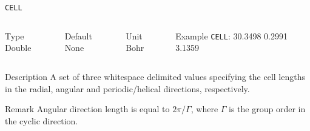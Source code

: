 \begin{frame}[allowframebreaks]{\texttt{{CELL}}} \label{CELL}
\vspace*{-12pt}
\begin{columns}
\begin{block}{Type}
Double
\end{block}

\begin{block}{Default}
None
\end{block}

\begin{block}{Unit}
Bohr
\end{block}

\begin{block}{Example}
\texttt{CELL}: 30.3498 0.2991 3.1359
\end{block}
\end{columns}

\begin{block}{Description}
A set of three whitespace delimited values specifying the cell lengths in the radial, angular and periodic/helical directions, respectively.
\end{block}

\begin{block}{Remark}
Angular direction length is equal to $ 2\pi / \Gamma$, where $ \Gamma $ is the group order in the cyclic direction.
\end{block}
\end{frame}


